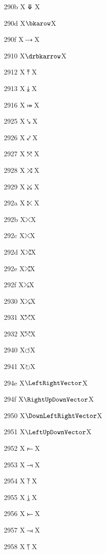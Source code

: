 \documentclass[11pt]{article}
\begin{document}
290b X{\ensuremath{\Ddownarrow}}X

290d X{\ensuremath{\bkarow}}X

290f X{\ensuremath{\dbkarow}}X

2910 X{\ensuremath{\drbkarrow}}X

2912 X{\ensuremath{\UpArrowBar}}X

2913 X{\ensuremath{\DownArrowBar}}X

2916 X{\ensuremath{\twoheadrightarrowtail}}X

2925 X{\ensuremath{\hksearow}}X

2926 X{\ensuremath{\hkswarow}}X

2927 X{\ensuremath{\tona}}X

2928 X{\ensuremath{\toea}}X

2929 X{\ensuremath{\tosa}}X

292a X{\ensuremath{\towa}}X

292b X{\ensuremath{\rdiagovfdiag}}X

292c X{\ensuremath{\fdiagovrdiag}}X

292d X{\ensuremath{\seovnearrow}}X

292e X{\ensuremath{\neovsearrow}}X

292f X{\ensuremath{\fdiagovnearrow}}X

2930 X{\ensuremath{\rdiagovsearrow}}X

2931 X{\ensuremath{\neovnwarrow}}X

2932 X{\ensuremath{\nwovnearrow}}X

2940 X{\ensuremath{\circlearrowleft}}X

2941 X{\ensuremath{\circlearrowright}}X

294e X{\ensuremath{\LeftRightVector}}X

294f X{\ensuremath{\RightUpDownVector}}X

2950 X{\ensuremath{\DownLeftRightVector}}X

2951 X{\ensuremath{\LeftUpDownVector}}X

2952 X{\ensuremath{\LeftVectorBar}}X

2953 X{\ensuremath{\RightVectorBar}}X

2954 X{\ensuremath{\RightUpVectorBar}}X

2955 X{\ensuremath{\RightDownVectorBar}}X

2956 X{\ensuremath{\DownLeftVectorBar}}X

2957 X{\ensuremath{\DownRightVectorBar}}X

2958 X{\ensuremath{\LeftUpVectorBar}}X
\end{document}
